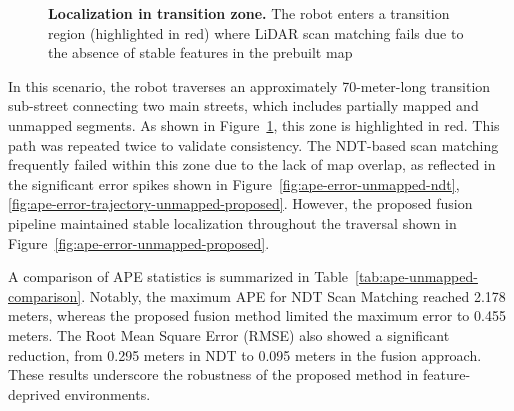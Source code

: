 \begin{figure}[H]
	\centering
	
	\caption[]%
	{\textbf{	Localization in transition zone.} The robot enters a transition region (highlighted in red) where LiDAR scan matching fails due to the absence of stable features in the prebuilt map
	}
	\label{fig:unmapped-zone}
\end{figure}

In this scenario, the robot traverses an approximately 70-meter-long transition sub-street connecting two main streets, which includes partially mapped and unmapped segments. As shown in Figure~\ref{fig:unmapped-zone}, this zone is highlighted in red. This path was repeated twice to validate consistency. The NDT-based scan matching frequently failed within this zone due to the lack of map overlap, as reflected in the significant error spikes shown in Figure~\ref{fig:ape-error-unmapped-ndt}, \ref{fig:ape-error-trajectory-unmapped-proposed}. However, the proposed fusion pipeline maintained stable localization throughout the traversal shown in Figure~\ref{fig:ape-error-unmapped-proposed}.

A comparison of APE statistics is summarized in Table~\ref{tab:ape-unmapped-comparison}. Notably, the maximum APE for NDT Scan Matching reached 2.178 meters, whereas the proposed fusion method limited the maximum error to 0.455 meters. The Root Mean Square Error (RMSE) also showed a significant reduction, from 0.295 meters in NDT to 0.095 meters in the fusion approach. These results underscore the robustness of the proposed method in feature-deprived environments.



